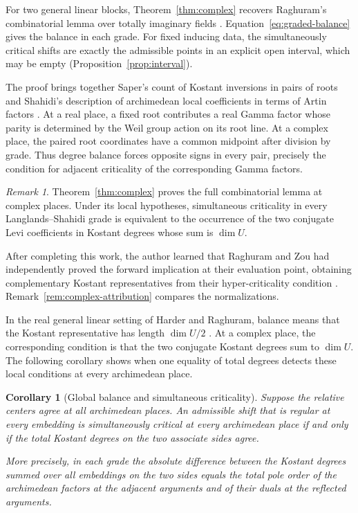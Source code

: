\documentclass[12pt]{amsart}
\numberwithin{equation}{section}
\theoremstyle{plain}
\newtheorem{corollary}[theorem]{Corollary}
\theoremstyle{definition}
\theoremstyle{remark}
\newtheorem{remark}[theorem]{Remark}
\begin{document}
For two general linear blocks, Theorem~\ref{thm:complex} recovers Raghuram's combinatorial lemma over totally imaginary fields \cite[Lemma~3.16]{Raghuram2025}. Equation~\eqref{eq:graded-balance} gives the balance in each grade. For fixed inducing data, the simultaneously critical shifts are exactly the admissible points in an explicit open interval, which may be empty (Proposition~\ref{prop:interval}).

The proof brings together Saper's count of Kostant inversions in pairs of roots \cite[Lemma~17.6]{SaperMicro} and Shahidi's description of archimedean local coefficients in terms of Artin factors \cite[\S3]{Shahidi1985}.  At a real place, a fixed root contributes a real Gamma factor whose parity is determined by the Weil group action on its root line. At a complex place, the paired root coordinates have a common midpoint after division by grade. Thus degree balance forces opposite signs in every pair, precisely the condition for adjacent criticality of the corresponding Gamma factors.

\begin{remark}\label{rem:intro-overlap}
Theorem~\ref{thm:complex} proves the full combinatorial lemma at complex places. Under its local hypotheses, simultaneous criticality in every Langlands--Shahidi grade is equivalent to the occurrence of the two conjugate Levi coefficients in Kostant degrees whose sum is $\dim U$. 

After completing this work, the author learned that Raghuram and Zou had independently proved the forward implication at their evaluation point, obtaining complementary Kostant representatives from their hyper-criticality condition \cite[Def.~5.8 and Lemma~7.15]{RaghuramZou2026}. Remark~\ref{rem:complex-attribution} compares the normalizations.
\end{remark}

In the real general linear setting of Harder and Raghuram, balance means that the Kostant representative has length $\dim U/2$ \cite[Lemma~7.14]{HarderRaghuram2020}. At a complex place, the corresponding condition is that the two conjugate Kostant degrees sum to $\dim U$. The following corollary shows when one equality of total degrees detects these local conditions at every archimedean place.

\begin{corollary}[Global balance and simultaneous criticality]
Suppose the relative centers agree at all archimedean places. An admissible shift that is regular at every embedding is simultaneously critical at every archimedean place if and only if the total Kostant degrees on the two associate sides agree.

More precisely, in each grade the absolute difference between the Kostant degrees summed over all embeddings on the two sides equals the total pole order of the archimedean factors at the adjacent arguments and of their duals at the reflected arguments.
\end{corollary}
\end{document}
